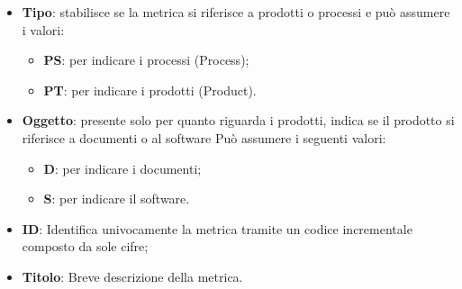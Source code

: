 \begin{itemize}
    \item \textbf{Tipo}: stabilisce se la metrica si riferisce a prodotti o processi e può assumere
    i valori:
    \begin{itemize}
        \item \textbf{PS}: per indicare i processi (Process);
        \item \textbf{PT}: per indicare i prodotti (Product).
    \end{itemize}
    \item \textbf{Oggetto}: presente solo per quanto riguarda i prodotti, indica se il prodotto si riferisce a 
    documenti o al software Può assumere i seguenti valori:
    \begin{itemize}
        \item \textbf{D}: per indicare i documenti;
        \item \textbf{S}: per indicare il software.
    \end{itemize}
    \item \textbf{ID}: Identifica univocamente la metrica tramite un codice incrementale composto da sole cifre;
    \item \textbf{Titolo}: Breve descrizione della metrica.
\end{itemize}



\newpage








